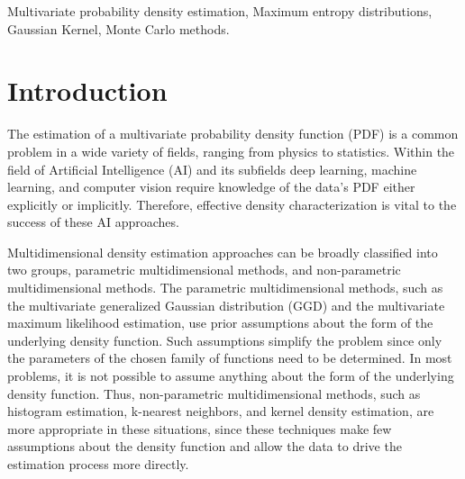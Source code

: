 \documentclass[conference]{IEEEtran}
\begin{document}
	
\begin{IEEEkeywords}
	Multivariate probability density estimation, Maximum entropy distributions, Gaussian Kernel, Monte Carlo methods.
\end{IEEEkeywords}
	
	
	
\section{Introduction}
	
The estimation of a multivariate probability density function (PDF) is a common problem in a wide variety of fields, ranging from physics to statistics. Within the field of Artificial Intelligence (AI) and its subfields deep learning, machine learning, and computer vision require knowledge of the data’s PDF either explicitly or implicitly. Therefore, effective density characterization is vital to the success of these AI approaches.
%
	
Multidimensional density estimation approaches can be broadly classified into two groups, parametric multidimensional methods, and non-parametric multidimensional methods. The parametric multidimensional methods, such as the multivariate generalized Gaussian distribution (GGD) \cite{sara:2005} and the multivariate maximum likelihood estimation, use prior assumptions about the form of the underlying density function. Such assumptions simplify the problem since only the parameters of the chosen family of functions need to be determined. In most problems, it is not possible to assume anything about the form of the underlying density function. Thus, non-parametric multidimensional methods, such as histogram estimation, k-nearest neighbors, and kernel density estimation, are more appropriate in these situations, since these techniques make few assumptions about the density function and allow the data to drive the estimation process more directly.
%
	
\end{document}
